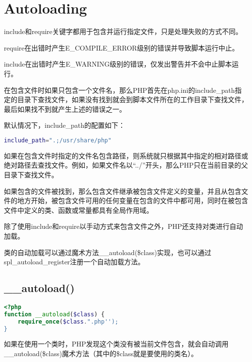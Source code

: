 \section{Autoloading}

include和require关键字都用于包含并运行指定文件，只是处理失败的方式不同。

\begin{compactitem}
\item require在出错时产生E\_COMPILE\_ERROR级别的错误并导致脚本运行中止。
\item include在出错时产生E\_WARNING级别的错误，仅发出警告并不会中止脚本运行。
\end{compactitem}

在包含文件时如果只包含一个文件名，那么PHP首先在php.ini的include\_path指定的目录下查找文件，如果没有找到就会到脚本文件所在的工作目录下查找文件，最后如果找不到就产生上述的错误之一。

默认情况下，include\_path的配置如下：


\begin{lstlisting}[language=bash]
include_path=".;/usr/share/php"
\end{lstlisting}

如果在包含文件时指定的文件名包含路径，则系统就只根据其中指定的相对路径或绝对路径去查找文件。例如，如果文件名以“../”开头，那么PHP只在当前目录的父目录下查找文件。

如果包含的文件被找到，那么包含文件继承被包含文件定义的变量，并且从包含文件的地方开始，被包含文件可用的任何变量在包含的文件中都可用，同时在被包含文件中定义的类、函数或常量都具有全局作用域。

除了使用include和require以手动方式来包含文件之外，PHP还支持对类进行自动加载。

类的自动加载可以通过魔术方法\_\_autoload(\$class)实现，也可以通过spl\_autoload\_register注册一个自动加载方法。



\subsection{\_\_autoload()}


\begin{lstlisting}[language=PHP]
<?php
function __autoload($class) {
    require_once($class.".php'');
}
\end{lstlisting}

如果在使用一个类时，PHP发现这个类没有被当前文件包含，就会自动调用\_\_autoload(\$class)魔术方法（其中的\$class就是要使用的类名）。



